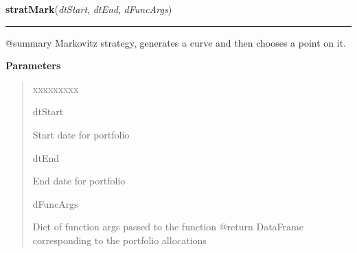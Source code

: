 \hspace{.8\funcindent}\begin{boxedminipage}{\funcwidth}

    \raggedright \textbf{stratMark}(\textit{dtStart}, \textit{dtEnd}, \textit{dFuncArgs})

    \vspace{-1.5ex}

    \rule{\textwidth}{0.5\fboxrule}
\setlength{\parskip}{2ex}
    @summary Markovitz strategy, generates a curve and then chooses a point
    on it.

\setlength{\parskip}{1ex}
      \textbf{Parameters}
      \vspace{-1ex}

      \begin{quote}
        \begin{Ventry}{xxxxxxxxx}

          \item[dtStart]

          Start date for portfolio

          \item[dtEnd]

          End date for portfolio

          \item[dFuncArgs]

          Dict of function args passed to the function @return DataFrame 
          corresponding to the portfolio allocations

        \end{Ventry}

      \end{quote}

    \end{boxedminipage}

    \label{QSTK:qstkstrat:strategies:stratMarkSharpe}

    \vspace{0.5ex}

